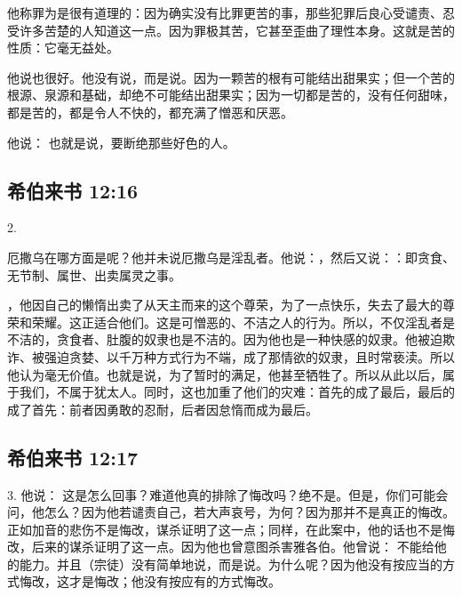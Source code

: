 他称罪为是很有道理的：因为确实没有比罪更苦的事，那些犯罪后良心受谴责、忍受许多苦楚的人知道这一点。因为罪极其苦，它甚至歪曲了理性本身。这就是苦的性质：它毫无益处。\par

他说也很好。他没有说，而是说。因为一颗苦的根有可能结出甜果实；但一个苦的根源、泉源和基础，却绝不可能结出甜果实；因为一切都是苦的，没有任何甜味，都是苦的，都是令人不快的，都充满了憎恶和厌恶。\par

他说： 也就是说，要断绝那些好色的人。\par


\subsection{希伯来书 12:16}

2. \par

厄撒乌在哪方面是呢？他并未说厄撒乌是淫乱者。他说：，然后又说：：即贪食、无节制、属世、出卖属灵之事。\par

，他因自己的懒惰出卖了从天主而来的这个尊荣，为了一点快乐，失去了最大的尊荣和荣耀。这正适合他们。这是可憎恶的、不洁之人的行为。所以，不仅淫乱者是不洁的，贪食者、肚腹的奴隶也是不洁的。因为他也是一种快感的奴隶。他被迫欺诈、被强迫贪婪、以千万种方式行为不端，成了那情欲的奴隶，且时常亵渎。所以他认为毫无价值。也就是说，为了暂时的满足，他甚至牺牲了。所以从此以后，属于我们，不属于犹太人。同时，这也加重了他们的灾难：首先的成了最后，最后的成了首先：前者因勇敢的忍耐，后者因怠惰而成为最后。\par


\subsection{希伯来书 12:17}

3. 他说： 这是怎么回事？难道他真的排除了悔改吗？绝不是。但是，你们可能会问，他怎么？因为他若谴责自己，若大声哀号，为何？因为那并不是真正的悔改。正如加音的悲伤不是悔改，谋杀证明了这一点；同样，在此案中，他的话也不是悔改，后来的谋杀证明了这一点。因为他也曾意图杀害雅各伯。他曾说： 不能给他的能力。并且（宗徒）没有简单地说，而是说。为什么呢？因为他没有按应当的方式悔改，这才是悔改；他没有按应有的方式悔改。\par

